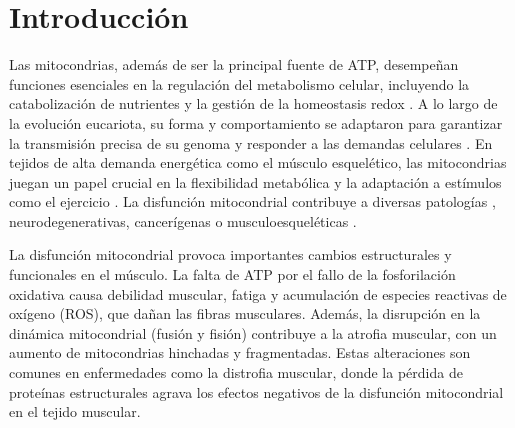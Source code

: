 \section{Introducción}

Las mitocondrias, además de ser la principal fuente de ATP, desempeñan funciones esenciales en la regulación del metabolismo celular, incluyendo la catabolización de nutrientes y la gestión de la homeostasis redox \cite{Spinelli2018}. A lo largo de la evolución eucariota, su forma y comportamiento se adaptaron para garantizar la transmisión precisa de su genoma y responder a las demandas celulares \cite{Friedman2014}. En tejidos de alta demanda energética como el músculo esquelético, las mitocondrias juegan un papel crucial en la flexibilidad metabólica y la adaptación a estímulos como el ejercicio \cite{Memme2021, Smith2023}. La disfunción mitocondrial contribuye a diversas patologías \cite{QuintanaCabrera2023}, neurodegenerativas, cancerígenas \cite{Chan2020} o musculoesqueléticas \cite{Liu2017}.

La disfunción mitocondrial provoca importantes cambios estructurales y funcionales en el músculo. La falta de ATP por el fallo de la fosforilación oxidativa causa debilidad muscular, fatiga y acumulación de especies reactivas de oxígeno (ROS), que dañan las fibras musculares. Además, la disrupción en la dinámica mitocondrial (fusión y fisión) contribuye a la atrofia muscular, con un aumento de mitocondrias hinchadas y fragmentadas. Estas alteraciones son comunes en enfermedades como la distrofia muscular, donde la pérdida de proteínas estructurales agrava los efectos negativos de la disfunción mitocondrial en el tejido muscular.
